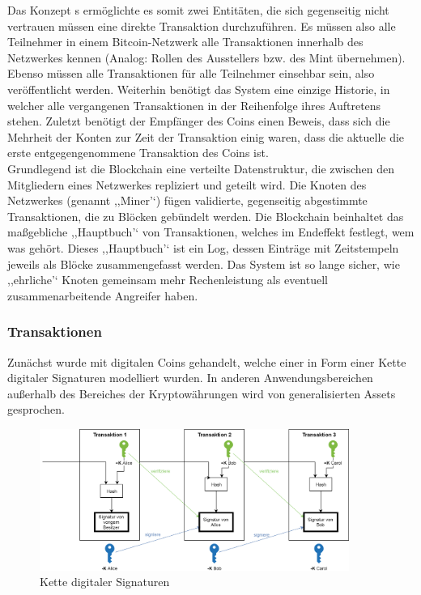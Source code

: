     Das Konzept \citeauthor{Nakamoto2008}s ermöglichte es somit zwei Entitäten, die sich gegenseitig nicht vertrauen müssen eine direkte Transaktion durchzuführen.
    Es müssen also alle Teilnehmer in einem Bitcoin-Netzwerk alle Transaktionen innerhalb des Netzwerkes kennen (Analog: Rollen des Ausstellers bzw. des Mint übernehmen).
    Ebenso müssen alle Transaktionen für alle Teilnehmer einsehbar sein, also veröffentlicht werden.
    Weiterhin benötigt das System eine einzige Historie, in welcher alle vergangenen Transaktionen in der Reihenfolge ihres Auftretens stehen.
    Zuletzt benötigt der Empfänger des Coins einen Beweis, dass sich die Mehrheit der Konten zur Zeit der Transaktion einig waren, dass die aktuelle die erste entgegengenommene Transaktion des Coins ist. 
    \cite{Nakamoto2008}
    \medskip\\
    
    \noindent Grundlegend ist die Blockchain eine verteilte Datenstruktur, die zwischen den Mitgliedern eines Netzwerkes repliziert und geteilt wird\cite{Christidis2016}.
    Die Knoten des Netzwerkes (genannt ,,Miner'`) fügen validierte, gegenseitig abgestimmte Transaktionen, die zu Blöcken gebündelt werden.
    Die Blockchain beinhaltet das maßgebliche ,,Hauptbuch'` von Transaktionen, welches im Endeffekt festlegt, wem was gehört.
    Dieses ,,Hauptbuch'` ist ein Log, dessen Einträge mit Zeitstempeln jeweils als Blöcke zusammengefasst werden.
    Das System ist so lange sicher, wie ,,ehrliche'` Knoten gemeinsam mehr Rechenleistung als eventuell zusammenarbeitende Angreifer haben\cite{Nakamoto2008}.
    
    \subsubsection{Transaktionen}
    \label{sec:sota_blockchain_trx}
	    Zunächst wurde mit digitalen Coins gehandelt, welche einer in Form einer Kette digitaler Signaturen modelliert wurden\cite{Nakamoto2008}.
	    In anderen Anwendungsbereichen außerhalb des Bereiches der Kryptowährungen wird von generalisierten Assets gesprochen.
	    \begin{figure}[H]
	    	\centering
	    	\includegraphics[width=0.9\textwidth]{graphics/transaction.png}
	    	\caption{Kette digitaler Signaturen}
	    	\label{fig:txio}
	    \end{figure}
    
